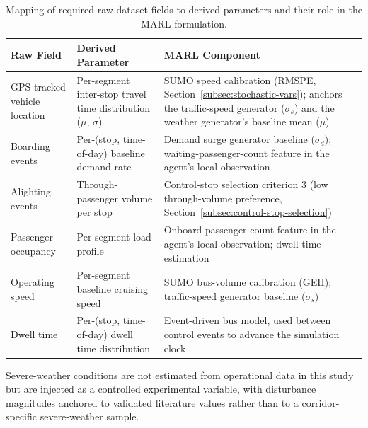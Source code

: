 \begin{table}[htbp]
\centering
\caption{Mapping of required raw dataset fields to derived parameters and their role in the MARL formulation.}
\label{tab:field-mapping}
\small
\renewcommand{\arraystretch}{1.25}

\begin{tabularx}{\textwidth}{
>{\RaggedRight\arraybackslash}p{}
>{\RaggedRight\arraybackslash}p{}
>{\RaggedRight\arraybackslash}X
}

\toprule
\textbf{Raw Field} & \textbf{Derived Parameter} & \textbf{MARL Component} \\
\midrule

GPS-tracked vehicle location &
Per-segment inter-stop travel time distribution ($\mu$, $\sigma$) &
SUMO speed calibration (RMSPE, Section~\ref{subsec:stochastic-vars}); anchors the traffic-speed generator ($\sigma_s$) and the weather generator's baseline mean ($\mu$) \\

Boarding events &
Per-(stop, time-of-day) baseline demand rate &
Demand surge generator baseline ($\sigma_d$); waiting-passenger-count feature in the agent's local observation \\

Alighting events &
Through-passenger volume per stop &
Control-stop selection criterion 3 (low through-volume preference, Section~\ref{subsec:control-stop-selection}) \\

Passenger occupancy &
Per-segment load profile &
Onboard-passenger-count feature in the agent's local observation; dwell-time estimation \\

Operating speed &
Per-segment baseline cruising speed &
SUMO bus-volume calibration (GEH); traffic-speed generator baseline ($\sigma_s$) \\

Dwell time &
Per-(stop, time-of-day) dwell time distribution &
Event-driven bus model, used between control events to advance the simulation clock \\

\bottomrule
\end{tabularx}
\end{table}

Severe-weather conditions are not estimated from operational data in this study but are injected as a controlled experimental variable, with disturbance magnitudes anchored to validated literature values rather than to a corridor-specific severe-weather sample.

